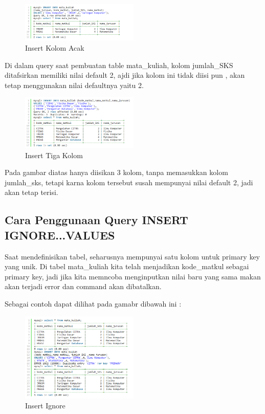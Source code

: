 		\begin{figure}[ht]
			\centerline{\includegraphics[width=0.5\textwidth]{figures/insert4.png}}
			\caption{Insert Kolom Acak}
			\label{insert4}
			\end{figure}
	
	Di dalam query saat pembuatan table mata_kuliah, kolom jumlah_SKS ditafsirkan memiliki nilai default 2, ajdi jika kolom ini tidak diisi pun , akan tetap menggunakan nilai defaultnya yaitu 2.
	
		\begin{figure}[ht]
			\centerline{\includegraphics[width=0.5\textwidth]{figures/insert5.png}}
			\caption{Insert Tiga Kolom}
			\label{insert5}
			\end{figure}
			
	Pada gambar diatas hanya diisikan 3 kolom, tanpa memasukkan kolom jumlah_sks, tetapi karna kolom tersebut susah mempunyai nilai default 2, jadi akan tetap terisi.
	
	\subsection{Cara Penggunaan Query INSERT IGNORE...VALUES}
	Saat mendefinisikan tabel, seharusnya mempunyai satu kolom untuk primary key yang unik. Di tabel mata_kuliah kita telah menjadikan kode_matkul sebagai primary key, jadi jika kita memncoba menginputkan nilai baru yang sama makan akan terjadi error dan command akan dibatalkan.
	
	Sebagai contoh dapat dilihat pada gamabr dibawah ini :
	
		\begin{figure}[ht]
			\centerline{\includegraphics[width=0.5\textwidth]{figures/insert6.png}}
			\caption{Insert Ignore}
			\label{insert6}
			\end{figure}
			
